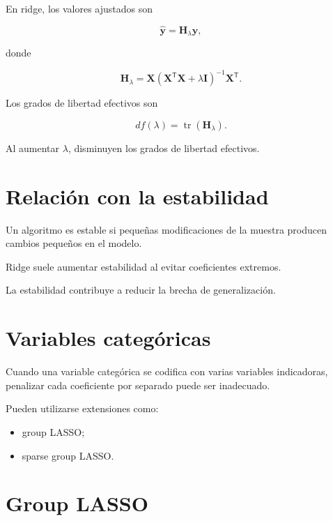 \documentclass[
  spanish,
  10.5pt,
  letterpaper,
  DIV=11,
  numbers=noendperiod,
  oneside,
  open=any]{scrreprt}
\providecommand{\tightlist}{%
  \setlength{\itemsep}{0pt}\setlength{\parskip}{0pt}}
\theoremstyle{definition}
\theoremstyle{definition}
\theoremstyle{plain}
\theoremstyle{remark}
\begin{document}

En ridge, los valores ajustados son

\[
\widehat{\mathbf{y}}
=
\mathbf{H}_{\lambda}\mathbf{y},
\]

donde

\[
\mathbf{H}_{\lambda}
=
\mathbf{X}
\left(
\mathbf{X}^{\mathsf T}\mathbf{X}
+
\lambda\mathbf{I}
\right)^{-1}
\mathbf{X}^{\mathsf T}.
\]

Los grados de libertad efectivos son

\[
df(\lambda)
=
\operatorname{tr}
(
\mathbf{H}_{\lambda}
).
\]

Al aumentar \(\lambda\), disminuyen los grados de libertad efectivos.

\section*{Relación con la
estabilidad}\label{relaciuxf3n-con-la-estabilidad}


Un algoritmo es estable si pequeñas modificaciones de la muestra
producen cambios pequeños en el modelo.

Ridge suele aumentar estabilidad al evitar coeficientes extremos.

La estabilidad contribuye a reducir la brecha de generalización.

\section*{Variables categóricas}\label{variables-categuxf3ricas}


Cuando una variable categórica se codifica con varias variables
indicadoras, penalizar cada coeficiente por separado puede ser
inadecuado.

Pueden utilizarse extensiones como:

\begin{itemize}
\tightlist
\item
  group LASSO;
\item
  sparse group LASSO.
\end{itemize}

\section*{Group LASSO}\label{group-lasso}
\end{document}
